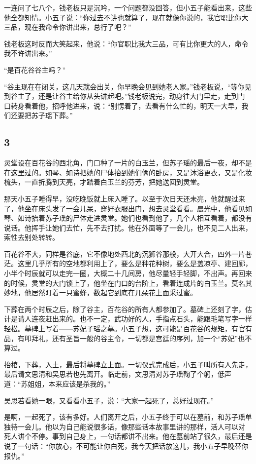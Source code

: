 一连问了七八个，钱老板只是沉吟，一个问题都没回答，但小五子能看出来，这些他全都知情。小五子说：“你过去不讲也就算了，现在就像你说的，我官职比你大三品，现在我命令你讲出来，总行了吧？”

钱老板这时反而大笑起来，他说：“你官职比我大三品，可有比你更大的人，命令我不许讲出来。”

“是百花谷谷主吗？”

“谷主现在在闭关，这几天就会出关，你早晚会见到她老人家。”钱老板说，“等你见到谷主了，还是让谷主给你从头讲起吧。”钱老板说完，动身往大门里走，走到门
口转身看着他，招呼他进来，说：“别愣着了，去看有什么忙的，明天一大早，我们还要把苏子瑶下葬。”
\newline

{\centering\subsection{3}}

灵堂设在百花谷的西北角，门口种了一片的白玉兰，但苏子瑶的最后一夜，却不是在这里过的。如琴、如诗把她的尸体抬到她们俩的卧房，又是沐浴更衣，又是化妆梳头，一直折腾到天亮，才踏着白玉兰的芬芳，把她送回到灵堂。

那天小五子睡得早，没吃晚饭就上床入睡了。以至于次日天还未亮，他就醒过来了，他坐在床头发了一会儿呆，穿好衣服出门，想去灵堂看看。晨光中，他看见如琴、如诗抬着苏子瑶的尸体走进灵堂。她们也看到他了，几个人相互看着，都没有说话。他挥手让她们去忙，先不去打扰。他在外面等了一会儿，也不见二人出来，索性去别处转转。

百花谷不大，同样是谷底，它不像地处西北的沉狮谷那般，大开大合，四外一片苍茫。这里几乎所有的空地都利用上了，要么是种花种树，要么是盖凉亭、建回廊，小半个时辰就可以走完一圈，大概二十几间房，他尽量轻手轻脚，不出声。再回来的时候，灵堂的大门锁上了，他坐在门口的台阶上，看着连成片的白玉兰。莫名其妙地，他居然盯着一只蜜蜂，数起它到底在几朵花上面采过蜜。

下葬在两个时辰之后，除了谷主，百花谷的所有人都参加了。墓碑上还刻了字，估计是请人连夜赶出来的。也不一定，武功好的人，手指点石头，能跟毛笔写字一样轻松。墓碑上写着——苏妃子瑶之墓。小五子想，这可能是百花谷的规矩，有官有品，有叩拜礼，还有圣旨一般的谷主令，一切都是宫廷的序列，加一个“苏妃”也不算过。

抬棺，下葬，入土，最后将墓碑立上面。一切仪式完成后，小五子叫所有人先走，最后请文思清和吴思若也先离开。临走前，文思清对苏子瑶鞠了个躬，低声道：“苏姐姐，本来应该是杀我的。”

吴思若看她一眼，又看看小五子，说：“大家一起死了，总好过现在。”

是啊，一起死了，该有多好。人们离开之后，小五子终于可以在墓前，和苏子瑶单独待一会儿。他以为自己能说很多话，像那些话本故事里讲的那样，活人可以对
死人讲个不停。事到自己身上，一句话都讲不出来。他在墓前站了很久，最后还是说了一句话：“你放心，不可能让你白死，我今天把话放这儿，我小五子早晚替你报仇。”


